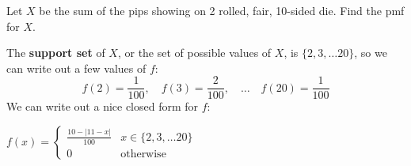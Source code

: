 \documentclass[../main.tex]{subfiles}
\begin{document}
\begin{example}
Let $X$ be the sum of the pips showing on 2 rolled, fair, 10-sided die.
Find the pmf for $X$.
\end{example}

\begin{solution}
The \textbf{support set} of $X$, or the set of possible values of $X$, is $\{ 2, 3, \ldots 20 \}$, so we can write out a few values of $f$: 
\[
    f(2) = \frac{1}{100}, \quad f(3) = \frac{2}{100}, \quad \ldots \quad f(20) = \frac{1}{100}
\]
We can write out a nice closed form for $f$: 
\begin{center} $f(x) = 
    \begin{cases}
        \frac{10 - |11-x|}{100} & x \in \{2, 3, \ldots 20 \} \\
        0 & \text{otherwise}
    \end{cases}$
\end{center}
\end{solution}
\end{document}
